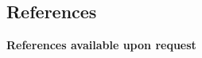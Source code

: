 \documentclass[margin,line]{res}
\newenvironment{list2}{
  \begin{list}{$\bullet$}{%
      \setlength{\itemsep}{0in}
      \setlength{\parsep}{0in} \setlength{\parskip}{0in}
      \setlength{\topsep}{0in} \setlength{\partopsep}{0in} 
      \setlength{\leftmargin}{0.2in}}}{\end{list}}
\begin{document}
\begin{resume}
\section{\sc References} 
{\bf References available upon request}

\end{resume}
\end{document}
